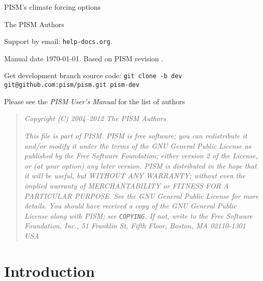 \documentclass[titlepage,letterpaper,final]{scrartcl}
\makeatletter
\newcommand{\PISMREV}{revision }
\newcommand{\PISMDOWNLOADMSG}{Get development branch source code: \quad\texttt{git clone -b dev git@github.com:pism/pism.git pism-dev} \quad}
\makeatother
\begin{document}
\begin{titlepage}

  \begin{center}
    \vspace*{3.5cm}
    {\huge{} PISM's climate forcing options}
    \vspace{0.5cm}

    {\Large The PISM Authors}
    \vspace{1cm}

    \vfill

    \small Support by email: \texttt{help\@@pism-docs.org}. 
    \medskip

    Manual date \today. Based on PISM \PISMREV.
    \medskip

    \PISMDOWNLOADMSG
  \end{center}
\end{titlepage}

\newpage
\phantom{bob}

\begin{center}
  Please see the \emph{PISM User's Manual} for the list of authors
\end{center}

\vspace{0.2in}
\begin{quote}
\textsl{Copyright (C) 2004--2012 The PISM Authors}
\medskip

\noindent \textsl{This file is part of PISM.  PISM is free software; you can redistribute it and/or modify it under the terms of the GNU General Public License as published by the Free Software Foundation; either version 2 of the License, or (at your option) any later version.  PISM is distributed in the hope that it will be useful, but WITHOUT ANY WARRANTY; without even the implied warranty of MERCHANTABILITY or FITNESS FOR A PARTICULAR PURPOSE.  See the GNU General Public License for more details.  You should have received a copy of the GNU General Public License along with PISM; see \emph{\texttt{COPYING}}.  If not, write to the Free Software Foundation, Inc., 51 Franklin St, Fifth Floor, Boston, MA  02110-1301 USA}
\end{quote}

\newpage
\setcounter{tocdepth}{3}
\small
\tableofcontents
\normalsize

\newpage


\section{Introduction}\label{sect:intro}
\end{document}
